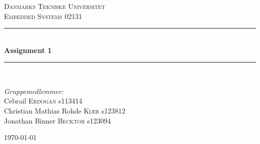 \documentclass[a4paper,12pt]{article}
\title{
\HRule \\
\textsc{\doctitle} \\
	 \small{\textsl{\docsubtitle}}
\HRule
}
\author{\docauthor\\\small{\docplace}}
\date{\docdate}
\newcommand{\HRule}{\rule{\linewidth}{0.5mm}}
\begin{document}
\begin{titlepage}
\begin{center}
\textsc{\LARGE Danmarks Tekniske Universitet}\\[1.5cm]
\textsc{\large Embedded Systems 02131}\\[0.5cm]
\HRule \\[0.4cm]
{ \huge \bfseries Assignment 1}\\[0.1cm]
\HRule \\[1.5cm]
\end{center}
\begin{flushleft} \large
\emph{Gruppemedlemmer:}\\
Cebrail \textsc{Erdogan} s113414\\
Christian Mathias Rohde \textsc{Kiær} s123812\\
Jonathan Binner \textsc{Becktor} s123094\\
\end{flushleft}
\vfill 
\begin{center}
{\large \today}
\end{center}
\end{titlepage}
\newpage
\end{document}
